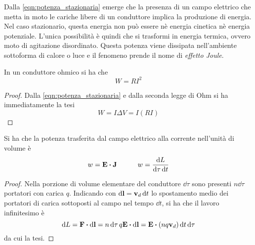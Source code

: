Dalla  \eqref{eqn:potenza_stazionaria} emerge che la presenza di un campo elettrico che metta in moto
le cariche libere di un conduttore implica la produzione di energia.
Nel caso stazionario, questa energia non può essere nè energia cinetica nè energia potenziale.
L'unica possibilità è quindi che si trasformi in energia termica, ovvero moto di agitazione disordinato.
Questa potenza viene dissipata nell'ambiente sottoforma di calore o luce e il fenomeno prende il nome di \textit{effetto Joule}.
\begin{thm}
    In un conduttore ohmico si ha che
    \begin{equation}
        \label{eqn:effetto_joule}
        W=RI^2
    \end{equation}
\end{thm}
\begin{proof}
    Dalla \eqref{eqn:potenza_stazionaria} e dalla seconda legge di Ohm si ha immediatamente la tesi
    \[
        W=I\Delta V=I (RI)
    \]
\end{proof}

\begin{thm}
    Si ha che la potenza trasferita dal campo elettrico alla corrente nell'unità di volume è
    \begin{equation}
        w=\vb{E}\vdot\vb{J} \quad\quad\quad w=\frac{\dd{L}}{\dd{\tau}\dd{t}}
    \end{equation}
\end{thm}
\begin{proof}
    Nella porzione di volume elementare del conduttore $\dd{\tau}$ sono presenti $n\dd{\tau}$
    portatori con carica $q$. Indicando con $\dd{\vb{l}}=\vb{v}_d\dd{t}$
    lo spostamento medio dei portatori di carica sottoposti al campo nel tempo $\dd{t}$,
    si ha che il lavoro infinitesimo è
    \[
        \dd{L}=\vb{F}\vdot\dd{\vb{l}}=n\dd{\tau}q\vb{E}\vdot \dd{\vb{l}}=\vb{E}\vdot (nq\vb{v}_d)\dd{t}\dd{\tau}
    \]
    da cui la tesi.
\end{proof}
